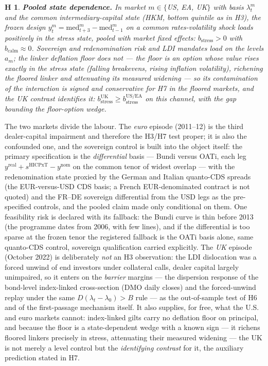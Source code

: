 \documentclass[11pt]{article}
\newtheorem{hypothesis}{H}
\begin{document}
\begin{hypothesis}\textbf{Pooled state dependence.} In market $m\in\{$US, EA, UK$\}$ with basis $\lambda^m_t$ and the common intermediary-capital state (HKM, bottom quintile as in H3), the frozen design $y^m_t=\text{med}^m_{t+3}-\text{med}^m_{t-1}$ on a common rates-volatility shock loads positively in the stress state, pooled with market fixed effects: $b_{\text{stress}}>0$ with $b_{\text{calm}}\approx0$. Sovereign and redenomination risk and LDI mandates load on the \emph{levels} $a_m$; the linker deflation floor does \emph{not} --- the floor is an option whose value rises exactly in the stress state (falling breakevens, rising inflation volatility), richening the floored linker and \emph{attenuating} its measured widening --- so its contamination of the interaction is signed and conservative for H7 in the floored markets, and the UK contrast identifies it: $b_{\text{stress}}^{\text{UK}}\ge b_{\text{stress}}^{\text{US/EA}}$ on this channel, with the gap bounding the floor-option wedge.\end{hypothesis}

The two markets divide the labour. The \emph{euro} episode (2011--12) is the third dealer-capital impairment and therefore the H3/H7 test proper; it is also the confounded one, and the sovereign control is built into the object itself: the primary specification is the \emph{differential} basis --- Bund\texteuro i versus OAT\texteuro i, each leg $y^{\text{real}}+s^{\text{HICPxT}}-y^{\text{nom}}$ on the common tenor of widest overlap --- with the redenomination state proxied by the German and Italian quanto-CDS spreads (the EUR-versus-USD CDS basis; a French EUR-denominated contract is not quoted) and the FR--DE sovereign differential from the USD legs as the pre-specified controls, and the pooled claim made only conditional on them. One feasibility risk is declared with its fallback: the Bund\texteuro i curve is thin before 2013 (the programme dates from 2006, with few lines), and if the differential is too sparse at the frozen tenor the registered fallback is the OAT\texteuro i basis alone, same quanto-CDS control, sovereign qualification carried explicitly. The \emph{UK} episode (October 2022) is deliberately \emph{not} an H3 observation: the LDI dislocation was a forced unwind of end investors under collateral calls, dealer capital largely unimpaired, so it enters on the \emph{barrier} margins --- the dispersion response of the bond-level index-linked cross-section (DMO daily closes) and the forced-unwind replay under the same $D(\lambda_t-\lambda_0)>B$ rule --- as the out-of-sample test of H6 and of the first-passage mechanism itself. It also supplies, for free, what the U.S. and euro markets cannot: index-linked gilts carry no deflation floor on principal, and because the floor is a state-dependent wedge with a known sign --- it richens floored linkers precisely in stress, attenuating their measured widening --- the UK is not merely a level control but the \emph{identifying contrast} for it, the auxiliary prediction stated in H7.
\end{document}
